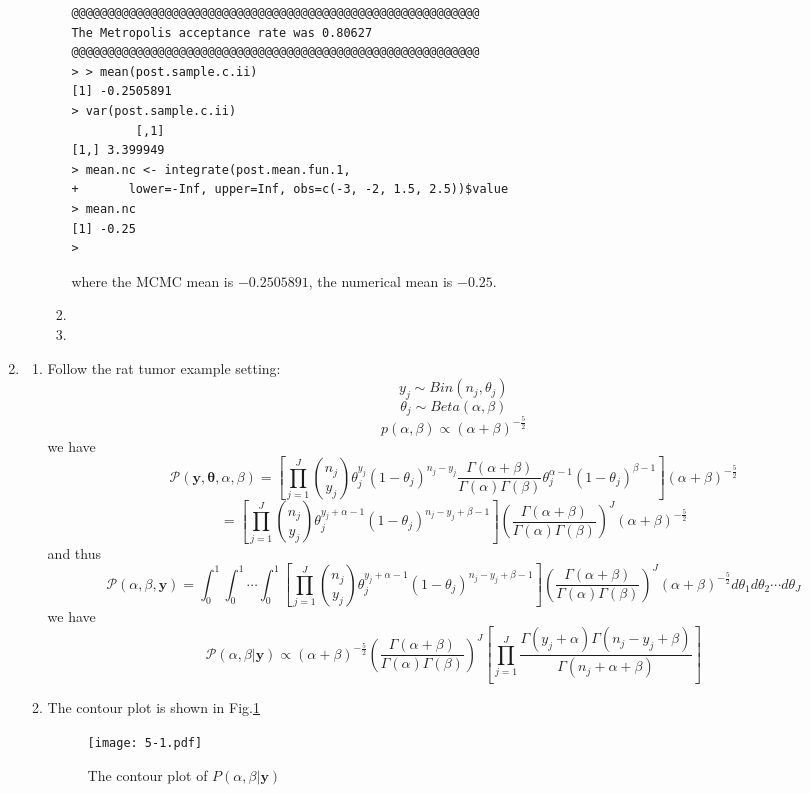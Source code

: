 \documentclass[twoside,11pt]{amsart}
\begin{document}
\begin{enumerate}
\begin{enumerate}
\begin{enumerate}
\begin{small}
\begin{verbatim}
@@@@@@@@@@@@@@@@@@@@@@@@@@@@@@@@@@@@@@@@@@@@@@@@@@@@@@@@@
The Metropolis acceptance rate was 0.80627
@@@@@@@@@@@@@@@@@@@@@@@@@@@@@@@@@@@@@@@@@@@@@@@@@@@@@@@@@
> > mean(post.sample.c.ii)
[1] -0.2505891
> var(post.sample.c.ii)
         [,1]
[1,] 3.399949
> mean.nc <- integrate(post.mean.fun.1, 
+       lower=-Inf, upper=Inf, obs=c(-3, -2, 1.5, 2.5))$value
> mean.nc
[1] -0.25
>         
    \end{verbatim}
      \end{small}
      where the MCMC mean is $-0.2505891$, the numerical mean is $-0.25$.
    \item
    \item
    \end{enumerate}
  \end{enumerate}
\item
  \begin{enumerate}
  \item
    Follow the rat tumor example setting:
    \[
    y_j \sim Bin(n_j, \theta_j)
    \]
    \[
    \theta_j\sim Beta(\alpha, \beta)
    \]
    \[
    p(\alpha, \beta)\propto (\alpha+\beta)^{-\frac{5}{2}}
    \]
    we have
    \[
    \mathscr P(\bm y, \bm\theta, \alpha, \beta) = \left[\prod_{j=1}^J
    { n_j \choose y_j}\theta_j^{y_j}(1-\theta_j)^{n_j-y_j}\frac{\Gamma(\alpha+\beta)}{\Gamma(\alpha)\Gamma(\beta)}\theta_j^{\alpha-1}(1-\theta_j)^{\beta-1}\right](\alpha+\beta)^{-\frac{5}{2}} 
    \]
   \[ =
    \left[\prod_{j=1}^J{n_j \choose y_j}\theta_j^{y_j+\alpha-1}(1-\theta_j)^{n_j-y_j+\beta-1}\right]\left(\frac{\Gamma(\alpha+\beta)}{\Gamma(\alpha)\Gamma(\beta)}\right)^{J}(\alpha+\beta)^{-\frac{5}{2}} 
   \]
   and thus
   \[
   \mathscr P(\alpha, \beta, \bm y) =
   \int_0^1\int_0^1\cdots\int_0^1\left[\prod_{j=1}^J{n_j \choose
       y_j}\theta_j^{y_j+\alpha-1}(1-\theta_j)^{n_j-y_j+\beta-1}\right]\left(\frac{\Gamma(\alpha+\beta)}{\Gamma(\alpha)\Gamma(\beta)}\right)^{J}(\alpha+\beta)^{-\frac{5}{2}}
   d\theta_1d\theta_2\cdots d\theta_J
   \]
   we have
   \[
   \mathscr P (\alpha, \beta|\bm y) \propto
   (\alpha+\beta)^{-\frac{5}{2}}\left(\frac{\Gamma(\alpha+\beta)}{\Gamma(\alpha)\Gamma(\beta)}\right)^{J}
   \left[\prod_{j=1}^J\frac{\Gamma(y_j+\alpha)\Gamma(n_j-y_j+\beta)}{\Gamma(n_j+\alpha+\beta)}\right]
   \]
  \item
    The contour plot is shown in Fig.\ref{fig:5-1}
    \begin{figure}[h]
        \texttt{[image: 5-1.pdf]}
        \caption{The contour plot of $P(\alpha, \beta|\bm y)$}\label{fig:5-1}
      \end{figure}




\end{enumerate}
\end{enumerate}
\end{document}
